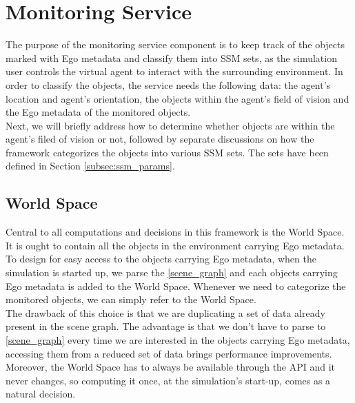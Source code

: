 \section{Monitoring Service} %
\label{sec:monitoring_service}
The purpose of the monitoring service component is to keep track of the objects marked with Ego metadata and classify them into SSM sets, as the simulation user controls the virtual agent to interact with the surrounding environment. In order to classify the objects, the service needs the following data: the agent's location and agent's orientation, the objects within the agent's field of vision and the Ego metadata of the monitored objects.\\

Next, we will briefly address how to determine whether objects are within the agent's filed of vision or not, followed by separate discussions on how the framework categorizes the objects into various SSM sets. The sets have been defined in Section \ref{subsec:ssm_params}.\\

\subsection{World Space}\label{subsec:world_space}
Central to all computations and decisions in this framework is the World Space. It is ought to contain all the objects in the environment carrying Ego metadata. To design for easy access to the objects carrying Ego metadata, when the simulation is started up, we parse the \ref{scene_graph} and each objects carrying Ego metadata is added to the World Space. Whenever we need to categorize the monitored objects, we can simply refer to the World Space.\\

The drawback of this choice is that we are duplicating a set of data already present in the scene graph. The advantage is that we don't have to parse to \ref{scene_graph} every time we are interested in the objects carrying Ego metadata, accessing them from a reduced set of data brings performance improvements. Moreover, the World Space has to always be available through the API and it never changes, so computing it once, at the simulation's start-up, comes as a natural decision.

